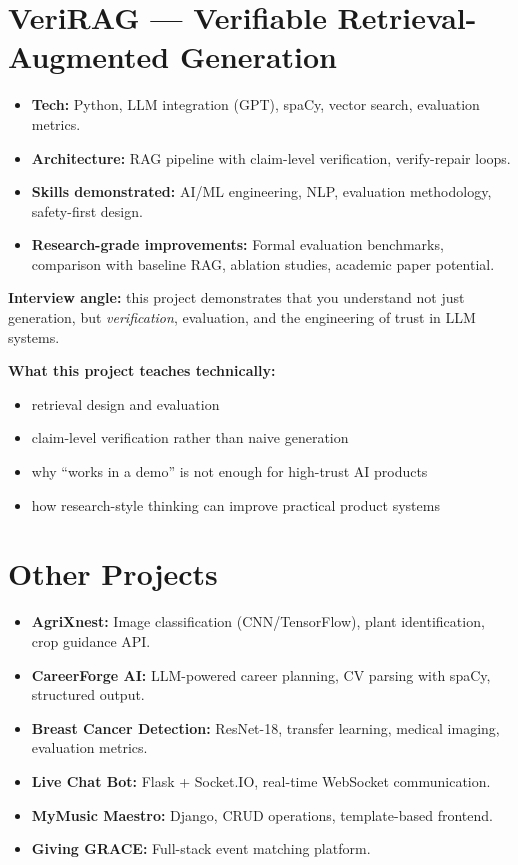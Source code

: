 \documentclass[12pt, a4paper, oneside]{book}
\begin{document}
\section{VeriRAG --- Verifiable Retrieval-Augmented Generation}
\begin{itemize}[leftmargin=2em]
    \item \textbf{Tech:} Python, LLM integration (GPT), spaCy, vector search, evaluation metrics.
    \item \textbf{Architecture:} RAG pipeline with claim-level verification, verify-repair loops.
    \item \textbf{Skills demonstrated:} AI/ML engineering, NLP, evaluation methodology, safety-first design.
    \item \textbf{Research-grade improvements:} Formal evaluation benchmarks, comparison with baseline RAG, ablation studies, academic paper potential.
\end{itemize}

\textbf{Interview angle:} this project demonstrates that you understand not just generation, but \emph{verification}, evaluation, and the engineering of trust in LLM systems.

\textbf{What this project teaches technically:}
\begin{itemize}[leftmargin=2em]
    \item retrieval design and evaluation
    \item claim-level verification rather than naive generation
    \item why ``works in a demo'' is not enough for high-trust AI products
    \item how research-style thinking can improve practical product systems
\end{itemize}

\section{Other Projects}
\begin{itemize}[leftmargin=2em]
    \item \textbf{AgriXnest:} Image classification (CNN/TensorFlow), plant identification, crop guidance API.
    \item \textbf{CareerForge AI:} LLM-powered career planning, CV parsing with spaCy, structured output.
    \item \textbf{Breast Cancer Detection:} ResNet-18, transfer learning, medical imaging, evaluation metrics.
    \item \textbf{Live Chat Bot:} Flask + Socket.IO, real-time WebSocket communication.
    \item \textbf{MyMusic Maestro:} Django, CRUD operations, template-based frontend.
    \item \textbf{Giving GRACE:} Full-stack event matching platform.
\end{itemize}
\end{document}
